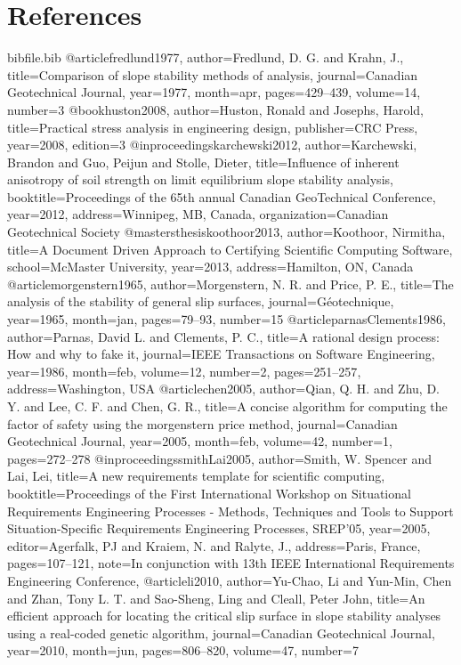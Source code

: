 \documentclass[12pt]{article}
\begin{document}
\section{References}
\label{Sec:References}
\begin{filecontents*}{bibfile.bib}
@article{fredlund1977,
author={Fredlund, D. G. and Krahn, J.},
title={Comparison of slope stability methods of analysis},
journal={Canadian Geotechnical Journal},
year={1977},
month=apr,
pages={429--439},
volume={14},
number={3}}
@book{huston2008,
author={Huston, Ronald and Josephs, Harold},
title={Practical stress analysis in engineering design},
publisher={CRC Press},
year={2008},
edition={3}}
@inproceedings{karchewski2012,
author={Karchewski, Brandon and Guo, Peijun and Stolle, Dieter},
title={Influence of inherent anisotropy of soil strength on limit equilibrium slope stability analysis},
booktitle={Proceedings of the 65th annual Canadian GeoTechnical Conference},
year={2012},
address={Winnipeg, MB, Canada},
organization={Canadian Geotechnical Society}}
@mastersthesis{koothoor2013,
author={Koothoor, Nirmitha},
title={A Document Driven Approach to Certifying Scientific Computing Software},
school={McMaster University},
year={2013},
address={Hamilton, ON, Canada}}
@article{morgenstern1965,
author={Morgenstern, N. R. and Price, P. E.},
title={The analysis of the stability of general slip surfaces},
journal={Géotechnique},
year={1965},
month=jan,
pages={79--93},
number={15}}
@article{parnasClements1986,
author={Parnas, David L. and Clements, P. C.},
title={A rational design process: How and why to fake it},
journal={IEEE Transactions on Software Engineering},
year={1986},
month=feb,
volume={12},
number={2},
pages={251--257},
address={Washington, USA}}
@article{chen2005,
author={Qian, Q. H. and Zhu, D. Y. and Lee, C. F. and Chen, G. R.},
title={A concise algorithm for computing the factor of safety using the morgenstern price method},
journal={Canadian Geotechnical Journal},
year={2005},
month=feb,
volume={42},
number={1},
pages={272--278}}
@inproceedings{smithLai2005,
author={Smith, W. Spencer and Lai, Lei},
title={A new requirements template for scientific computing},
booktitle={Proceedings of the First International Workshop on Situational Requirements Engineering Processes - Methods, Techniques and Tools to Support Situation-Specific Requirements Engineering Processes, SREP'05},
year={2005},
editor={Agerfalk, PJ and Kraiem, N. and Ralyte, J.},
address={Paris, France},
pages={107--121},
note={In conjunction with 13th IEEE International Requirements Engineering Conference,}}
@article{li2010,
author={Yu-Chao, Li and Yun-Min, Chen and Zhan, Tony L. T. and Sao-Sheng, Ling and Cleall, Peter John},
title={An efficient approach for locating the critical slip surface in slope stability analyses using a real-coded genetic algorithm},
journal={Canadian Geotechnical Journal},
year={2010},
month=jun,
pages={806--820},
volume={47},
number={7}}
\end{filecontents*}
\nocite{*}
\printbibliography[heading=none]
\end{document}
